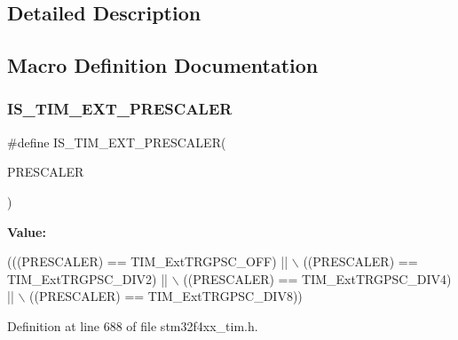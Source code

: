 \subsection{Detailed Description}


\subsection{Macro Definition Documentation}
\mbox{\label{group___t_i_m___external___trigger___prescaler_ga615587e6aae397d9fe8166004e7324f2}} 
\subsubsection{\texorpdfstring{I\+S\+\_\+\+T\+I\+M\+\_\+\+E\+X\+T\+\_\+\+P\+R\+E\+S\+C\+A\+L\+ER}{IS\_TIM\_EXT\_PRESCALER}}
{\footnotesize\ttfamily \#define I\+S\+\_\+\+T\+I\+M\+\_\+\+E\+X\+T\+\_\+\+P\+R\+E\+S\+C\+A\+L\+ER(\begin{DoxyParamCaption}\item[{}]{P\+R\+E\+S\+C\+A\+L\+ER }\end{DoxyParamCaption})}

{\bfseries Value\+:}
\begin{DoxyCode}
(((PRESCALER) == TIM\_ExtTRGPSC\_OFF) || \(\backslash\)
                                         ((PRESCALER) == TIM\_ExtTRGPSC\_DIV2) || \(\backslash\)
                                         ((PRESCALER) == TIM\_ExtTRGPSC\_DIV4) || \(\backslash\)
                                         ((PRESCALER) == TIM\_ExtTRGPSC\_DIV8))
\end{DoxyCode}


Definition at line 688 of file stm32f4xx\+\_\+tim.\+h.

